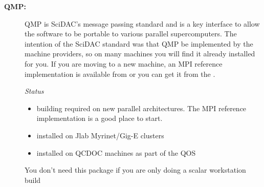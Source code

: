 \documentclass{article}
\begin{document}
\begin{description}
\item[{\bf QMP: \ } ]
QMP is SciDAC's message passing standard and is a key interface to allow the software to be portable to various parallel supercomputers. The intention of the SciDAC standard was that QMP be implemented by the machine providers, so on many machines you will find it already installed for you. If you are moving to a new machine, an MPI reference implementation is available from  or you can get 
it from the . {\em Status
\begin{itemize}
\item 
building required on new parallel architectures. The MPI reference implementation is a good place to start.
\item
installed on Jlab Myrinet/Gig-E clusters
\item
installed on QCDOC machines as part of the QOS
\end{itemize}
You don't need this package if you are only doing a scalar workstation build
}


\end{description}
\end{document}

